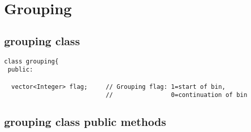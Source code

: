 \documentclass[11pt]{book}
\begin{document}
\section{Grouping}

\subsection{grouping class}

\begin{verbatim}
class grouping{
 public:

  vector<Integer> flag;     // Grouping flag: 1=start of bin, 
                            //                0=continuation of bin
\end{verbatim}

\subsection{grouping class public methods}
\end{document}
